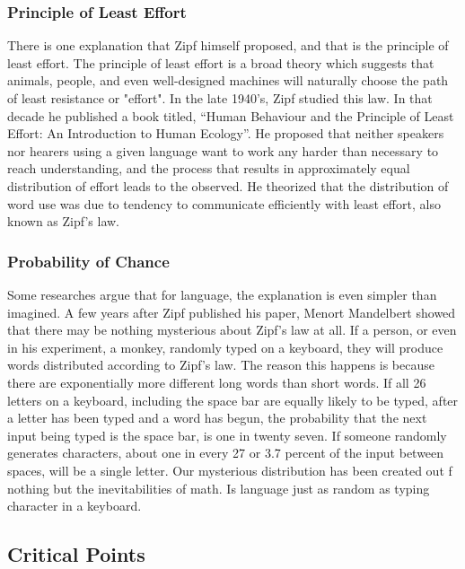 \documentclass[a4paper,10pt]{article}
\begin{document}
\subsubsection{Principle of Least Effort}

There is one explanation that Zipf himself proposed, and that is the principle of least effort. The principle of least effort is a broad theory which suggests that animals, people, and even well-designed machines will naturally choose the path of least resistance or "effort". In the late 1940’s, Zipf studied this law. In that decade he published a book titled, “Human Behaviour and the Principle of Least Effort: An Introduction to Human Ecology”. He proposed that neither speakers nor hearers using a given language want to work any harder than necessary to reach understanding, and the process that results in approximately equal distribution of effort leads to the observed. He theorized that the distribution of word use was due to tendency to communicate efficiently with least effort, also known as Zipf’s law. 


\subsubsection{Probability of Chance}

Some researches argue that for language, the explanation is even simpler than imagined. A few years after Zipf published his paper, Menort Mandelbert showed that there may be nothing mysterious about Zipf's law at all. If a person, or even in his experiment, a monkey, randomly typed on a keyboard, they will produce words distributed according to Zipf's law. The reason this happens is because there are exponentially more different long words than short words. If all 26 letters on a keyboard, including the space bar are equally likely to be typed, after a letter has been typed and a word has begun, the probability that the next input being typed is the space bar, is one in twenty seven.  If someone randomly generates  characters, about one in every 27 or 3.7 percent of the input between spaces, will be a single letter. Our mysterious distribution has been created out f nothing but the inevitabilities of math. Is language just as random as typing character in a keyboard.


\subsection{Critical Points}
\end{document}
